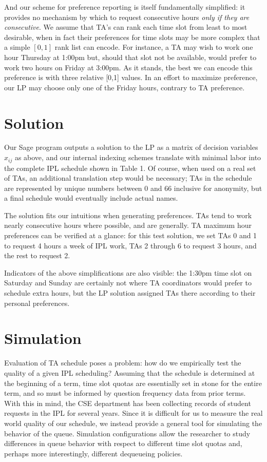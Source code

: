 \documentclass{article}
\begin{document}
\begin{multicols}{2}
And our scheme for preference reporting is itself fundamentally simplified: it provides no mechanism by which to request consecutive hours \textit{only if they are consecutive}. We assume that TA's can rank each time slot from least to most desirable, when in fact their preferences for time slots may be more complex that a simple $[0, 1]$ rank list can encode. For instance, a TA may wish to work one hour Thursday at 1:00pm but, should that slot not be available, would prefer to work two hours on Friday at 3:00pm. As it stands, the best we can encode this preference is with three relative [0,1] values. In an effort to maximize preference, our LP may choose only one of the Friday hours, contrary to TA preference.

\section*{Solution}

Our Sage program outputs a solution to the LP as a matrix of decision variables $x_{ij}$ as above, and our internal indexing schemes translate with minimal labor into the complete IPL schedule shown in Table 1. Of course, when used on a real set of TAs, an additional translation step would be necessary; TAs in the schedule are represented by unique numbers between 0 and 66 inclusive for anonymity, but a final schedule would eventually include actual names.

The solution fits our intuitions when generating preferences. TAs tend to work nearly consecutive hours where possible, and are generally. TA maximum hour preferences can be verified at a glance: for this test solution, we set TAs 0 and 1 to request 4 hours a week of IPL work, TAs 2 through 6 to request 3 hours, and the rest to request 2.

Indicators of the above simplifications are also visible: the 1:30pm time slot on Saturday and Sunday are certainly not where TA coordinators would prefer to schedule extra hours, but the LP solution assigned TAs there according to their personal preferences.

\section*{Simulation}

Evaluation of TA schedule poses a problem: how do we empirically test the quality of a given IPL scheduling? Assuming that the schedule is determined at the beginning of a term, time slot quotas are essentially set in stone for the entire term, and so must be informed by question frequency data from prior terms. With this in mind, the CSE department has been collecting records of student requests in the IPL for several years. Since it is difficult for us to measure the real world quality of our schedule, we instead provide a general tool for simulating the behavior of the queue. Simulation configurations allow the researcher to study differences in queue behavior with respect to different time slot quotas and, perhaps more interestingly, different dequeueing policies.


\end{multicols}
\end{document}
